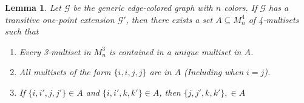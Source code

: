 \documentclass{amsart}
\newtheorem{lemma}[theorem]{Lemma}
\def\graph{\mathcal{G}}
\newcommand{\set}[1]{\{#1 \}}
\begin{document}
\begin{lemma}\label{existence of palettes}
    Let $\graph$ be the generic edge-colored graph with $n$ colors. If $\graph$ has a transitive one-point extension $\graph'$, then there exists a set $A \subseteq M_n^4$ of 4-multisets such that
    \begin{enumerate}
        \item Every 3-multiset in $M_n^3$ is contained in a unique multiset in $A$.

        \item All multisets of the form $\set{i, i, j, j}$ are in $A$ (Including when $i = j$).

        \item If $\set{i, i', j, j'} \in A$ and $\set{i, i', k, k'} \in A$, then $\set{j, j', k, k'}, \in A$
    \end{enumerate}
\end{lemma}
\end{document}
